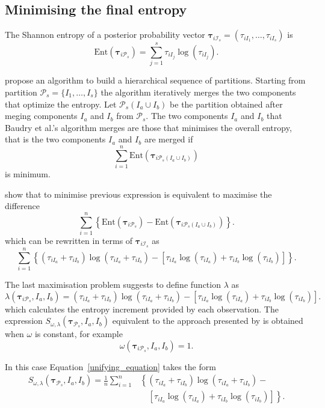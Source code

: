 \documentclass[submit]{smj}
\theoremstyle{definition}
\newcommand{\m}[1]{\boldsymbol{#1}}
\begin{document}
\subsection{Minimising the final entropy}
\label{entropy_section}

The Shannon entropy of a posterior probability vector $\m\tau_{i \mathcal{I}_s} = \left( \tau_{i I_1} , \dots, \tau_{i I_s}  \right)$ is
\[
\text{Ent}( \m\tau_{i \mathcal{P}_s} ) = \sum_{j=1}^s \tau_{i I_j}  \log(\tau_{i I_j} ).
\]


\cite{baudry2010combining} propose an algorithm to build a hierarchical sequence of partitions. Starting from partition $\mathcal{P}_s = \{ I_1, \dots, I_s\}$ the algorithm iteratively merges  the two components that optimize the entropy. Let $\mathcal{P}_s(I_a\cup I_b)$ be the partition obtained after meging components $I_a$ and $I_b$ from $\mathcal{P}_s$. The two components $I_a$ and $I_b$ that Baudry et al.'s algorithm merges are those that minimises the overall entropy, that is the two components $I_a$ and $I_b$ are merged if
\[
\sum_{i=1}^n \text{Ent}( \m\tau_{i \mathcal{P}_s(I_a\cup I_b)} )
\]
is minimum.


\cite{baudry2010combining}  show that to minimise previous expression is equivalent to maximise the difference
\[
\sum_{i=1}^n  \left\{ \text{Ent}( \m\tau_{i \mathcal{P}_s} ) - \text{Ent}( \m\tau_{i \mathcal{P}_s(I_a\cup I_b)} ) \right\}.
\]
which can be rewritten in terms of $\m\tau_{i \mathcal{I}_s}$ as
\begin{equation}\label{entropy}
\sum_{i=1}^n   \left\{(\tau_{iI_a}+\tau_{iI_b}) \log(\tau_{iI_a} + \tau_{iI_b}) - \left[\tau_{iI_a} \log(\tau_{iI_a}) + \tau_{iI_b} \log(\tau_{iI_b})\right] \right\}.
\end{equation}


The last maximisation problem suggests to define function $\lambda$ as
\[
\lambda(\m\tau_{i \mathcal{P}_s},  I_a,  I_b) =  (\tau_{iI_a}+\tau_{iI_b}) \log(\tau_{iI_a} + \tau_{iI_b}) - \left[ \tau_{iI_a} \log(\tau_{iI_a}) + \tau_{iI_b} \log(\tau_{iI_b}) \right].
\]
which calculates the entropy increment provided by each observation. The expression $S_{\omega, \lambda}( \m\tau_{\mathcal{P}_s},  I_a,  I_b) $ equivalent to the approach presented by \cite{baudry2010combining} is obtained when $\omega$ is constant, for example 
\[
\omega(\m\tau_{i \mathcal{P}_s},  I_a,  I_b) = 1.
\]

In this case Equation~\ref{unifying_equation} takes the form
\[
\begin{split}
S_{\omega, \lambda}( \m\tau_{\mathcal{P}_s},  I_a,  I_b) = \frac{1}{n} \sum_{i=1}^n & \left\{(\tau_{iI_a}+\tau_{iI_b}) \log(\tau_{iI_a} + \tau_{iI_b}) - \right.\\ 
&\quad \left.\left[ \tau_{iI_a} \log(\tau_{iI_a}) + \tau_{iI_b} \log(\tau_{iI_b}) \right]\right\}.
\end{split}
\]
\end{document}
